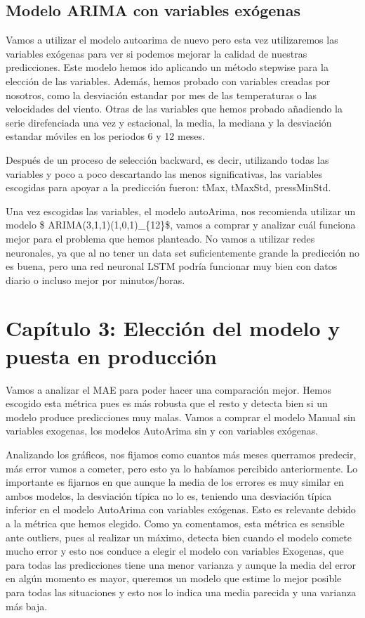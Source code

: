 \documentclass[11pt]{article}
\begin{document}
    \hypertarget{modelo-arima-con-variables-exuxf3genas}{%
\subsection{Modelo ARIMA con variables
exógenas}\label{modelo-arima-con-variables-exuxf3genas}}

    Vamos a utilizar el modelo autoarima de nuevo pero esta vez utilizaremos
las variables exógenas para ver si podemos mejorar la calidad de
nuestras predicciones. Este modelo hemos ido aplicando un método
stepwise para la elección de las variables. Además, hemos probado con
variables creadas por nosotros, como la desviación estandar por mes de
las temperaturas o las velocidades del viento. Otras de las variables
que hemos probado añadiendo la serie direfenciada una vez y estacional,
la media, la mediana y la desviación estandar móviles en los periodos 6
y 12 meses.

Después de un proceso de selección backward, es decir, utilizando todas
las variables y poco a poco descartando las menos significativas, las
variables escogidas para apoyar a la predicción fueron: tMax, tMaxStd,
pressMinStd.

    Una vez escogidas las variables, el modelo autoArima, nos recomienda
utilizar un modelo \$ ARIMA(3,1,1)(1,0,1)\_\{12\}\$, vamos a comprar y
analizar cuál funciona mejor para el problema que hemos planteado. No
vamos a utilizar redes neuronales, ya que al no tener un data set
suficientemente grande la predicción no es buena, pero una red neuronal
LSTM podría funcionar muy bien con datos diario o incluso mejor por
minutos/horas.

    \hypertarget{capuxedtulo-3-elecciuxf3n-del-modelo-y-puesta-en-producciuxf3n}{%
\section{Capítulo 3: Elección del modelo y puesta en
producción}\label{capuxedtulo-3-elecciuxf3n-del-modelo-y-puesta-en-producciuxf3n}}

    Vamos a analizar el MAE para poder hacer una comparación mejor. Hemos
escogido esta métrica pues es más robusta que el resto y detecta bien si
un modelo produce predicciones muy malas. Vamos a comprar el modelo
Manual sin variables exogenas, los modelos AutoArima sin y con variables
exógenas.

    Analizando los gráficos, nos fijamos como cuantos más meses querramos
predecir, más error vamos a cometer, pero esto ya lo habíamos percibido
anteriormente. Lo importante es fijarnos en que aunque la media de los
errores es muy similar en ambos modelos, la desviación típica no lo es,
teniendo una desviación típica inferior en el modelo AutoArima con
variables exógenas. Esto es relevante debido a la métrica que hemos
elegido. Como ya comentamos, esta métrica es sensible ante outliers,
pues al realizar un máximo, detecta bien cuando el modelo comete mucho
error y esto nos conduce a elegir el modelo con variables Exogenas, que
para todas las predicciones tiene una menor varianza y aunque la media
del error en algún momento es mayor, queremos un modelo que estime lo
mejor posible para todas las situaciones y esto nos lo indica una media
parecida y una varianza más baja.
\end{document}
